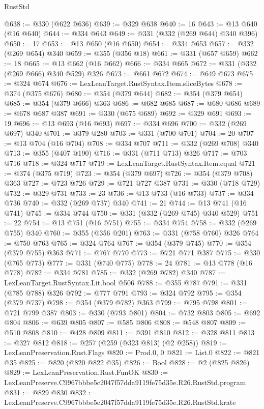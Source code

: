 \begin{lexlean}{RustStd}
\begin{coremodule}
@638 := @330 (@622 @636)
@639 := @329 @638
@640 := 16
@643 := @13 @640 (@16 @640)
@644 := @334 @643
@649 := @331 (@332 (@269 @644) @340 @396)
@650 := 17
@653 := @13 @650 (@16 @650)
@654 := @334 @653
@657 := @332 (@269 @654) @340
@659 := @355 (@356 @18)
@661 := @331 (@657 @659)
@662 := 18
@665 := @13 @662 (@16 @662)
@666 := @334 @665
@672 := @331 (@332 (@269 @666) @340 @529) @326
@673 := @661 @672
@674 := @649 @673
@675 := @324 @674
@676 := LexLeanTarget.RustSyntax.Item.sliceBytes
@678 := @374 (@375 @676)
@680 := @354 (@379 @644)
@682 := @354 (@379 @654)
@685 := @354 (@379 @666) @363
@686 := @682 @685
@687 := @680 @686
@689 := @678 @687 @387
@691 := @330 (@675 @689)
@692 := @329 @691
@693 := 19
@696 := @13 @693 (@16 @693)
@697 := @334 @696
@700 := @332 (@269 @697) @340
@701 := @379 @280
@703 := @331 (@700 @701)
@704 := 20
@707 := @13 @704 (@16 @704)
@708 := @334 @707
@711 := @332 (@269 @708) @340
@713 := @355 (@407 @190)
@716 := @331 (@711 @713) @326
@717 := @703 @716
@718 := @324 @717
@719 := LexLeanTarget.RustSyntax.Item.equal
@721 := @374 (@375 @719)
@723 := @354 (@379 @697)
@726 := @354 (@379 @708) @363
@727 := @723 @726
@729 := @721 @727 @387
@731 := @330 (@718 @729)
@732 := @329 @731
@733 := 23
@736 := @13 @733 (@16 @733)
@737 := @334 @736
@740 := @332 (@269 @737) @340
@741 := 21
@744 := @13 @741 (@16 @741)
@745 := @334 @744
@750 := @331 (@332 (@269 @745) @340 @529)
@751 := 22
@754 := @13 @751 (@16 @751)
@755 := @334 @754
@758 := @332 (@269 @755) @340
@760 := @355 (@356 @201)
@763 := @331 (@758 @760) @326
@764 := @750 @763
@765 := @324 @764
@767 := @354 (@379 @745)
@770 := @354 (@379 @755) @363
@771 := @767 @770
@773 := @721 @771 @387
@775 := @330 (@765 @773)
@777 := @331 (@740 @775)
@778 := 24
@781 := @13 @778 (@16 @778)
@782 := @334 @781
@785 := @332 (@269 @782) @340
@787 := LexLeanTarget.RustSyntax.Lit.bool @506
@788 := @355 @787
@791 := @331 (@785 @788) @326
@792 := @777 @791
@793 := @324 @792
@795 := @354 (@379 @737)
@798 := @354 (@379 @782) @363
@799 := @795 @798
@801 := @721 @799 @387
@803 := @330 (@793 @801)
@804 := @732 @803
@805 := @692 @804
@806 := @639 @805
@807 := @585 @806
@808 := @548 @807
@809 := @510 @808
@810 := @428 @809
@811 := @391 @810
@812 := @328 @811
@813 := @327 @812
@818 := @257 (@259 (@323 @813) (@2 @258))
@819 := LexLeanPreservation.Rust.Flags
@820 := Prod.{0, 0}
@821 := List.{0}
@822 := @821 @35
@825 := @820 (@820 @822 @35)
@826 := Bool
@828 := @2 (@825 @826)
@829 := LexLeanPreservation.Rust.FunOK
@830 := LexLeanPreserve.C9967bbbe5c2047f57dda9119fe75d35e.R26.RustStd.program
@831 := @829 @830
@832 := LexLeanPreserve.C9967bbbe5c2047f57dda9119fe75d35e.R26.RustStd.krate

\end{coremodule}
\end{lexlean}
